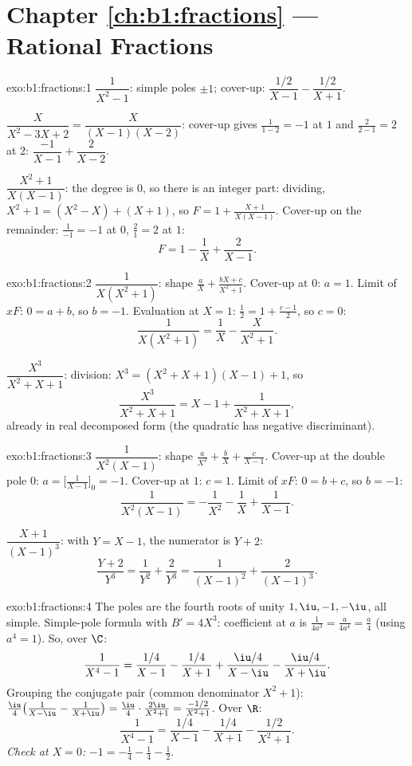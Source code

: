 \section*{Chapter \ref{ch:b1:fractions} --- Rational Fractions}

\begin{solution}{exo:b1:fractions:1}
$\dfrac{1}{X^2 - 1}$: simple poles $\pm 1$; cover-up:
$\dfrac{1/2}{X-1} - \dfrac{1/2}{X+1}$.

$\dfrac{X}{X^2 - 3X + 2} = \dfrac{X}{(X-1)(X-2)}$: cover-up gives
$\frac{1}{1-2} = -1$ at $1$ and $\frac{2}{2-1} = 2$ at $2$:
$\dfrac{-1}{X-1} + \dfrac{2}{X-2}$.

$\dfrac{X^2+1}{X(X-1)}$: the degree is $0$, so there is an integer
part: dividing, $X^2 + 1 = (X^2 - X) + (X + 1)$, so $F = 1 +
\frac{X+1}{X(X-1)}$. Cover-up on the remainder: $\frac{1}{-1} = -1$
at $0$, $\frac{2}{1} = 2$ at $1$:
\[
F = 1 - \frac{1}{X} + \frac{2}{X-1} .
\]
\end{solution}

\begin{solution}{exo:b1:fractions:2}
$\dfrac{1}{X(X^2+1)}$: shape $\frac aX + \frac{bX + c}{X^2 + 1}$.
Cover-up at $0$: $a = 1$. Limit of $xF$: $0 = a + b$, so $b = -1$.
Evaluation at $X = 1$: $\frac12 = 1 + \frac{c - 1}{2}$, so $c = 0$:
\[
\frac{1}{X(X^2+1)} = \frac 1X - \frac{X}{X^2+1} .
\]

$\dfrac{X^3}{X^2+X+1}$: division: $X^3 = (X^2+X+1)(X - 1) + 1$, so
\[
\frac{X^3}{X^2+X+1} = X - 1 + \frac{1}{X^2 + X + 1} ,
\]
already in real decomposed form (the quadratic has negative
discriminant).
\end{solution}

\begin{solution}{exo:b1:fractions:3}
$\dfrac{1}{X^2(X-1)}$: shape $\frac{a}{X^2} + \frac bX +
\frac{c}{X-1}$. Cover-up at the double pole $0$:
$a = \bigl[\frac{1}{X-1}\bigr]_{0} = -1$. Cover-up at $1$: $c = 1$.
Limit of $xF$: $0 = b + c$, so $b = -1$:
\[
\frac{1}{X^2(X-1)} = -\frac{1}{X^2} - \frac1X + \frac{1}{X-1} .
\]

$\dfrac{X+1}{(X-1)^3}$: with $Y = X - 1$, the numerator is $Y + 2$:
\[
\frac{Y + 2}{Y^3} = \frac{1}{Y^2} + \frac{2}{Y^3}
= \frac{1}{(X-1)^2} + \frac{2}{(X-1)^3} .
\]
\end{solution}

\begin{solution}{exo:b1:fractions:4}
The poles are the fourth roots of unity $1, \iu, -1, -\iu$, all
simple. Simple-pole formula with $B' = 4X^3$: coefficient at $a$ is
$\frac{1}{4a^3} = \frac{a}{4a^4} = \frac a4$ (using $a^4 = 1$). So,
over $\C$:
\[
\frac{1}{X^4 - 1}
= \frac{1/4}{X - 1} - \frac{1/4}{X + 1}
+ \frac{\iu/4}{X - \iu} - \frac{\iu/4}{X + \iu} .
\]
Grouping the conjugate pair (common denominator $X^2 + 1$):
$\frac{\iu}{4}\bigl(\frac{1}{X-\iu} - \frac{1}{X+\iu}\bigr) =
\frac{\iu}{4}\cdot\frac{2\iu}{X^2+1} = \frac{-1/2}{X^2+1}$. Over
$\R$:
\[
\frac{1}{X^4 - 1}
= \frac{1/4}{X-1} - \frac{1/4}{X+1} - \frac{1/2}{X^2 + 1} .
\]
\emph{Check at $X = 0$:} $-1 = -\frac14 - \frac14 - \frac12$.
\end{solution}

